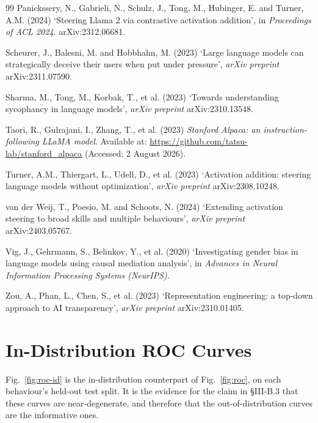 \documentclass[conference]{IEEEtran}
\begin{document}
\begin{thebibliography}{99}
Panickssery, N., Gabrieli, N., Schulz, J., Tong, M., Hubinger, E. and Turner,
A.M. (2024) `Steering Llama 2 via contrastive activation addition', in
\textit{Proceedings of ACL 2024}. arXiv:2312.06681.

Scheurer, J., Balesni, M. and Hobbhahn, M. (2023) `Large language models can
strategically deceive their users when put under pressure',
\textit{arXiv preprint} arXiv:2311.07590.

Sharma, M., Tong, M., Korbak, T., et al. (2023) `Towards understanding sycophancy
in language models', \textit{arXiv preprint} arXiv:2310.13548.

Taori, R., Gulrajani, I., Zhang, T., et al. (2023) \textit{Stanford Alpaca: an
instruction-following LLaMA model}. Available at:
\url{https://github.com/tatsu-lab/stanford_alpaca} (Accessed: 2 August 2026).

Turner, A.M., Thiergart, L., Udell, D., et al. (2023) `Activation addition:
steering language models without optimization', \textit{arXiv preprint}
arXiv:2308.10248.

van der Weij, T., Poesio, M. and Schoots, N. (2024) `Extending activation
steering to broad skills and multiple behaviours', \textit{arXiv preprint}
arXiv:2403.05767.

Vig, J., Gehrmann, S., Belinkov, Y., et al. (2020) `Investigating gender bias in
language models using causal mediation analysis', in \textit{Advances in Neural
Information Processing Systems (NeurIPS)}.

Zou, A., Phan, L., Chen, S., et al. (2023) `Representation engineering: a
top-down approach to AI transparency', \textit{arXiv preprint} arXiv:2310.01405.

\end{thebibliography}

\appendices



\section{In-Distribution ROC Curves}\label{app:roc-id}
Fig.~\ref{fig:roc-id} is the in-distribution counterpart of Fig.~\ref{fig:roc},
on each behaviour's held-out test split. It is the evidence for the claim in
§III-B.3 that these curves are near-degenerate, and therefore that the
out-of-distribution curves are the informative ones.
\end{document}
